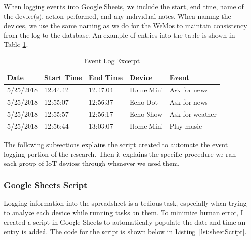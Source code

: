 When logging events into Google Sheets, we include the start, end time, name of the device(s), action performed, and any individual notes. When naming the devices, we use the same naming as we do for the WeMos to maintain consistency from the log to the database. An example of entries into the table is shown in Table \ref{tab:events}.

\begin{table}[H]
    \centering
    \caption{Event Log Excerpt}
    \begin{tabular}{@{}lllll@{}}
        \toprule
        Date & Start Time & End Time & Device & Event \\ \midrule
        5/25/2018 & 12:44:42 & 12:47:04 & Home Mini & Ask for news \\
        5/25/2018 & 12:55:07 & 12:56:37 & Echo Dot & Ask for news \\
        5/25/2018 & 12:55:57 & 12:56:17 & Echo Show & Ask for weather \\
        5/25/2018 & 12:56:44 & 13:03:07 & Home Mini & Play music \\ \bottomrule
        \end{tabular}
    \label{tab:events}
\end{table}

The following subsections explains the script created to automate the event logging portion of the research. Then it explains the specific procedure we ran each group of IoT devices through whenever we used them.

\subsubsection{Google Sheets Script}

Logging information into the spreadsheet is a tedious task, especially when trying to analyze each device while running tasks on them. To minimize human error, I created a script in Google Sheets to automatically populate the date and time an entry is added. The code for the script is shown below in Listing~\ref{lst:sheetScript}.

